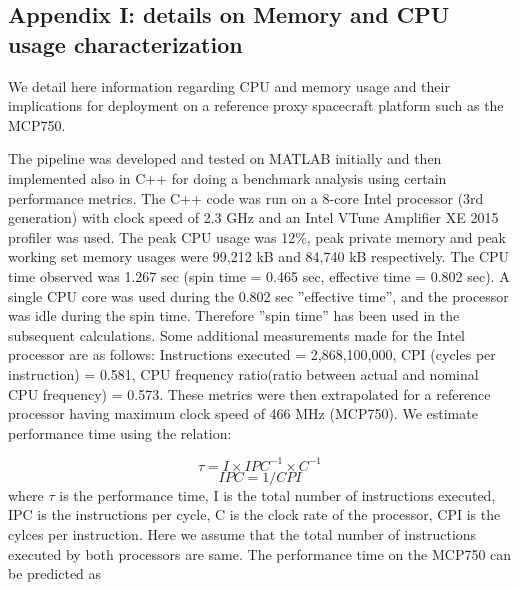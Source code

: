 \subsection{Appendix I: details on Memory and CPU usage characterization}
We detail here information regarding  CPU and memory usage and their implications for deployment on a reference proxy spacecraft platform such as the MCP750.

%
The pipeline was developed and tested on MATLAB initially and then implemented also in C++ for doing a benchmark analysis using certain performance metrics. The C++ code was run on a 8-core Intel processor (3rd generation) with clock speed of 2.3 GHz and an Intel VTune Amplifier XE 2015 profiler was used. The peak CPU usage was 12\%, peak private memory and peak working set memory usages were 99,212 kB and 84,740 kB respectively. The CPU time observed was 1.267 sec (spin time = 0.465 sec, effective time = 0.802 sec). A single CPU core was used during the 0.802 sec ''effective time'', and the processor was idle during the spin time. Therefore ''spin time'' has been used in the subsequent calculations. Some additional measurements made for the Intel processor are as follows:
        Instructions executed = 2,868,100,000, 
        CPI (cycles per instruction) = 0.581, 
        CPU frequency ratio(ratio between actual and nominal CPU frequency) = 0.573.
%        
These metrics were then extrapolated for a reference processor having maximum clock speed of 466 MHz (MCP750). We estimate performance time using the relation:
        
        \begin{equation}
        \tau = I\times IPC^{-1}\times C^{-1}
        \end{equation}
        \begin{equation}
        IPC = 1/CPI
        \end{equation}
        \noindent where $\tau$ is the performance time, I is the total number of instructions executed, IPC is the instructions per cycle, C is the clock rate of the processor, CPI is the cylces per instruction.
        Here we assume that the total number of instructions executed by both processors are same. The performance time on the MCP750 can be predicted as
        
